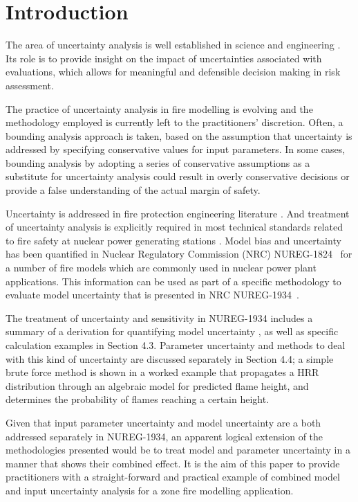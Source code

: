 \documentclass[12pt]{article}
\begin{document}
\section{Introduction}
\label{sec:introduction}

The area of uncertainty analysis is well established in science and engineering \cite{Morgan, Spiegel, Vose, Kumamoto, Haimes}.  Its role is to provide insight on the impact of uncertainties associated with evaluations, which allows for meaningful and defensible decision making in risk assessment.

The practice of uncertainty analysis in fire modelling is evolving and the methodology employed is currently left to the practitioners' discretion. Often, a bounding analysis approach is taken, based on the assumption that uncertainty is addressed by specifying conservative values for input parameters. In some cases, bounding analysis by adopting a series of conservative assumptions as a substitute for uncertainty analysis could result in overly conservative decisions or provide a false understanding of the actual margin of safety. 

Uncertainty is addressed in fire protection engineering literature \cite{Notarianni:SFPE,  NUREG_1824, McGrattan2011a, Notarianni:1999, Lundin, Hostikka:2003a, Upadhyay2008, FDS_Validation_Guide}.  And treatment of uncertainty analysis is explicitly required in most technical standards related to fire safety at nuclear power generating stations \cite{NFPA:805, NUREG:6850}.  Model bias and uncertainty has been quantified in Nuclear Regulatory Commission (NRC) NUREG-1824~\cite{NUREG_1824} for a number of fire models which are commonly used in nuclear power plant applications. This information can be used as part of a specific methodology to evaluate model uncertainty  that is presented in NRC NUREG-1934~\cite{NUREG_1934}. 

The treatment of  uncertainty and sensitivity in NUREG-1934 includes a summary of a derivation for quantifying model uncertainty \cite{McGrattan2011a}, as well as specific calculation examples in Section 4.3. Parameter uncertainty and methods to deal with this kind of uncertainty are discussed separately in Section 4.4; a simple brute force method is shown in  a worked example that propagates a HRR distribution through an algebraic model for predicted flame height, and determines the probability of flames reaching a certain height.

Given that input parameter uncertainty and model uncertainty are a both addressed separately in NUREG-1934, an apparent logical extension of the methodologies presented would be to treat model and parameter uncertainty in a manner that shows their combined effect.  It is the aim of this paper to provide practitioners with a straight-forward and practical example of combined model and input uncertainty analysis for a zone fire modelling application. 
\end{document}
